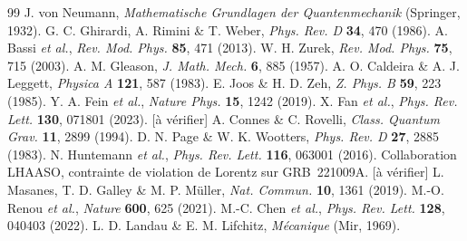 \documentclass[11pt,a4paper]{article}
\newcommand{\statut}[1]{{\footnotesize\textsf{[#1]}}}
\theoremstyle{plain}
\theoremstyle{definition}
\theoremstyle{remark}
\begin{document}
\begin{thebibliography}{99}
 J. von Neumann, \textit{Mathematische Grundlagen der Quantenmechanik} (Springer, 1932).
 G. C. Ghirardi, A. Rimini \& T. Weber, \textit{Phys. Rev. D} \textbf{34}, 470 (1986).
 A. Bassi \textit{et al.}, \textit{Rev. Mod. Phys.} \textbf{85}, 471 (2013).
 W. H. Zurek, \textit{Rev. Mod. Phys.} \textbf{75}, 715 (2003).
 A. M. Gleason, \textit{J. Math. Mech.} \textbf{6}, 885 (1957).
 A. O. Caldeira \& A. J. Leggett, \textit{Physica A} \textbf{121}, 587 (1983).
 E. Joos \& H. D. Zeh, \textit{Z. Phys. B} \textbf{59}, 223 (1985).
 Y. A. Fein \textit{et al.}, \textit{Nature Phys.} \textbf{15}, 1242 (2019).
 X. Fan \textit{et al.}, \textit{Phys. Rev. Lett.} \textbf{130}, 071801 (2023). \statut{\`a v\'erifier}
 A. Connes \& C. Rovelli, \textit{Class. Quantum Grav.} \textbf{11}, 2899 (1994).
 D. N. Page \& W. K. Wootters, \textit{Phys. Rev. D} \textbf{27}, 2885 (1983).
 N. Huntemann \textit{et al.}, \textit{Phys. Rev. Lett.} \textbf{116}, 063001 (2016).
 Collaboration LHAASO, contrainte de violation de Lorentz sur GRB~221009A. \statut{\`a v\'erifier}
 L. Masanes, T. D. Galley \& M. P. M\"uller, \textit{Nat. Commun.} \textbf{10}, 1361 (2019).
 M.-O. Renou \textit{et al.}, \textit{Nature} \textbf{600}, 625 (2021).
 M.-C. Chen \textit{et al.}, \textit{Phys. Rev. Lett.} \textbf{128}, 040403 (2022).
 L. D. Landau \& E. M. Lifchitz, \textit{M\'ecanique} (Mir, 1969).
\end{thebibliography}
\end{document}
